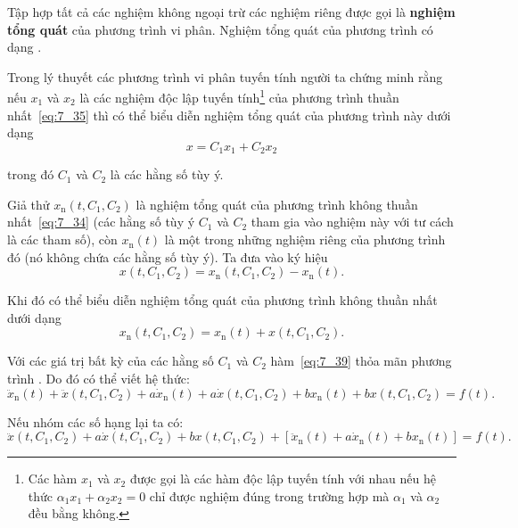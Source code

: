 Tập hợp tất cả các nghiệm không ngoại trừ các nghiệm riêng được gọi là \textbf{nghiệm tổng quát} của phương trình vi phân. Nghiệm tổng quát của phương trình  có dạng .

Trong lý thuyết các phương trình vi phân tuyến tính người ta chứng minh rằng nếu $x_1$ và $x_2$ là các nghiệm độc lập tuyến tính\footnote{Các hàm $x_1$ và $x_2$ được gọi là các hàm độc lập tuyến tính với nhau nếu hệ thức $\alpha_1 x_1+\alpha_2 x_2=0$ chỉ được nghiệm đúng trong trường hợp mà $\alpha_1$ và $\alpha_2$ đều bằng không.} của phương trình thuần nhất~\eqref{eq:7_35} thì có thể biểu diễn nghiệm tổng quát của phương trình này dưới dạng
\begin{equation}\label{eq:7_38}
	x = C_1 x_1 + C_2 x_2
\end{equation}

\noindent
trong đó $C_1$ và $C_2$ là các hằng số tùy ý.

Giả thử $x_{\text{n}}(t, C_1, C_2)$ là nghiệm tổng quát của phương trình không thuần nhất~\eqref{eq:7_34} (các hằng số tùy ý $C_1$ và $C_2$ tham gia vào nghiệm này với tư cách là các tham số), còn $x_{\text{n}}(t)$ là một trong những nghiệm riêng của phương trình đó (nó không chứa các hằng số tùy ý). Ta đưa vào ký hiệu
\begin{equation*}
	x(t, C_1, C_2) = x_{\text{n}}(t, C_1, C_2) - x_{\text{n}}(t).
\end{equation*}

\noindent
Khi đó có thể biểu diễn nghiệm tổng quát của phương trình không thuần nhất dưới dạng
\begin{equation}\label{eq:7_39}
	x_{\text{n}}(t, C_1, C_2) = x_{\text{n}}(t) + x(t, C_1, C_2).
\end{equation}

\noindent
Với các giá trị bất kỳ của các hằng số $C_1$ và $C_2$ hàm~\eqref{eq:7_39} thỏa mãn phương trình . Do đó có thể viết hệ thức:
\begin{equation*}
	\ddot{x}_{\text{n}}(t) + \ddot{x}(t, C_1, C_2) + a\dot{x}_{\text{n}}(t) + a\dot{x}(t, C_1, C_2) + bx_{\text{n}}(t) + bx(t, C_1, C_2) = f(t).
\end{equation*}

\noindent
Nếu nhóm các số hạng lại ta có:
\begin{equation}\label{eq:7_40}
	\ddot{x}(t, C_1, C_2) + a\dot{x}(t, C_1, C_2) + bx(t, C_1, C_2) + [\ddot{x}_{\text{n}}(t) + a\dot{x}_{\text{n}}(t) + bx_{\text{n}}(t)] = f(t).
\end{equation}


